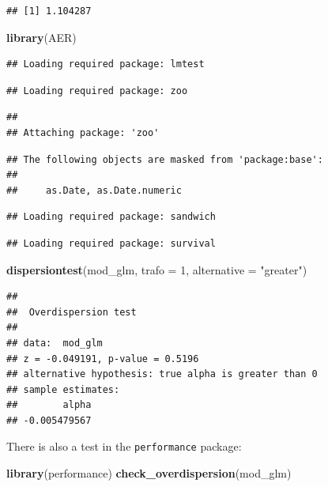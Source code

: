 \documentclass[
]{article}
\newenvironment{Shaded}{\begin{snugshade}}{\end{snugshade}}
\newcommand{\AttributeTok}[1]{\textcolor[rgb]{0.13,0.29,0.53}{#1}}
\newcommand{\DecValTok}[1]{\textcolor[rgb]{0.00,0.00,0.81}{#1}}
\newcommand{\FunctionTok}[1]{\textcolor[rgb]{0.13,0.29,0.53}{\textbf{#1}}}
\newcommand{\NormalTok}[1]{#1}
\newcommand{\StringTok}[1]{\textcolor[rgb]{0.31,0.60,0.02}{#1}}
\begin{document}
\begin{verbatim}
## [1] 1.104287
\end{verbatim}

\begin{Shaded}
\begin{Highlighting}[]
\FunctionTok{library}\NormalTok{(AER)}
\end{Highlighting}
\end{Shaded}

\begin{verbatim}
## Loading required package: lmtest
\end{verbatim}

\begin{verbatim}
## Loading required package: zoo
\end{verbatim}

\begin{verbatim}
## 
## Attaching package: 'zoo'
\end{verbatim}

\begin{verbatim}
## The following objects are masked from 'package:base':
## 
##     as.Date, as.Date.numeric
\end{verbatim}

\begin{verbatim}
## Loading required package: sandwich
\end{verbatim}

\begin{verbatim}
## Loading required package: survival
\end{verbatim}

\begin{Shaded}
\begin{Highlighting}[]
\FunctionTok{dispersiontest}\NormalTok{(mod\_glm, }\AttributeTok{trafo =} \DecValTok{1}\NormalTok{, }\AttributeTok{alternative =} \StringTok{"greater"}\NormalTok{) }
\end{Highlighting}
\end{Shaded}

\begin{verbatim}
## 
##  Overdispersion test
## 
## data:  mod_glm
## z = -0.049191, p-value = 0.5196
## alternative hypothesis: true alpha is greater than 0
## sample estimates:
##        alpha 
## -0.005479567
\end{verbatim}

There is also a test in the \texttt{performance} package:

\begin{Shaded}
\begin{Highlighting}[]
\FunctionTok{library}\NormalTok{(performance)}
\FunctionTok{check\_overdispersion}\NormalTok{(mod\_glm)}
\end{Highlighting}
\end{Shaded}
\end{document}
